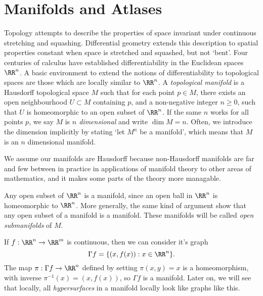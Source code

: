 \section{Manifolds and Atlases}

Topology attempts to describe the properties of space invariant under continuous stretching and squashing. Differential geometry extends this description to spatial properties constant when space is stretched and squashed, but not `bent'. Four centuries of calculus have established differentiability in the Euclidean spaces $\RR^n$. A basic environment to extend the notions of differentiability to topological spaces are those which are locally similar to $\RR^n$. A \emph{topological manifold} is a Hausdorff topological space $M$ such that for each point $p \in M$, there exists an open neighbourhood $U \subset M$ containing $p$, and a non-negative integer $n \geq 0$, such that $U$ is homeomorphic to an open subset of $\RR^n$. If the same $n$ works for all points $p$, we say $M$ is \emph{$n$ dimensional} and write $\dim M = n$. Often, we introduce the dimension implicitly by stating `let $M^n$ be a manifold', which means that $M$ is an $n$ dimensional manifold.

\begin{remark}
    We assume our manifolds are Hausdorff because non-Hausdorff manifolds are far and few between in practice in applications of manifold theory to other areas of mathematics, and it makes some parts of the theory more managable.
\end{remark}

\begin{example}
    Any open subset of $\RR^n$ is a manifold, since an open ball in $\RR^n$ is homeomorphic to $\RR^n$. More generally, the same kind of argument show that any open subset of a manifold is a manifold. These manifolds will be called \emph{open submanifolds} of $M$.
\end{example}

\begin{example}
    If $f: \RR^n \to \RR^m$ is continuous, then we can consider it's graph
    \[ \Gamma f = \{ (x, f(x)) : x \in \RR^n \}. \]
    The map $\pi: \Gamma f \to \RR^n$ defined by setting $\pi(x,y) = x$ is a homeomorphism, with inverse $\pi^{-1}(x) = (x,f(x))$, so $\Gamma f$ is a manifold. Later on, we will see that locally, all \emph{hypersurfaces} in a manifold locally look like graphs like this.
\end{example}

